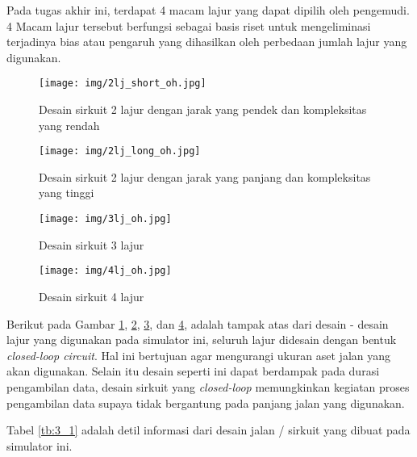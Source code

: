     \par Pada tugas akhir ini, terdapat 4 macam lajur yang dapat dipilih oleh pengemudi. 4 Macam lajur tersebut berfungsi sebagai basis riset untuk mengeliminasi terjadinya bias atau pengaruh yang dihasilkan oleh perbedaan jumlah lajur yang digunakan.
    
\begin{figure}  [!htb]
	\captionsetup{justification=centering}
	\texttt{[image: img/2lj\_short\_oh.jpg]}
	\caption{Desain sirkuit 2 lajur dengan jarak yang pendek dan kompleksitas yang rendah}
	\label{fig: 3_3}
\end{figure}
\vspace{1ex}

\begin{figure}  [!htb]
	\captionsetup{justification=centering}
	\texttt{[image: img/2lj\_long\_oh.jpg]}
	\caption{Desain sirkuit 2 lajur dengan jarak yang panjang dan kompleksitas yang tinggi}
	\label{fig: 3_4}
\end{figure}
\vspace{1ex}

\begin{figure}  [!htb]
	\captionsetup{justification=centering}
	\texttt{[image: img/3lj\_oh.jpg]}
	\caption{Desain sirkuit 3 lajur}
	\label{fig: 3_5}
\end{figure}
\vspace{1ex}

\begin{figure}  [!htb]
	\captionsetup{justification=centering}
	\texttt{[image: img/4lj\_oh.jpg]}
	\caption{Desain sirkuit 4 lajur}
	\label{fig: 3_6}
\end{figure}
\vspace{1ex}

    \par Berikut pada Gambar \ref{fig: 3_3}, \ref{fig: 3_4}, \ref{fig: 3_5}, dan \ref{fig: 3_6}, adalah tampak atas dari desain - desain lajur yang digunakan pada simulator ini, seluruh lajur didesain dengan bentuk \textit{closed-loop circuit}. Hal ini bertujuan agar mengurangi ukuran aset jalan yang akan digunakan. Selain itu desain seperti ini dapat berdampak pada durasi pengambilan data, desain sirkuit yang \textit{closed-loop} memungkinkan kegiatan proses pengambilan data supaya tidak bergantung pada panjang jalan yang digunakan.
    \par Tabel \ref{tb:3_1} adalah detil informasi dari desain jalan / sirkuit yang dibuat pada simulator ini. 
    
